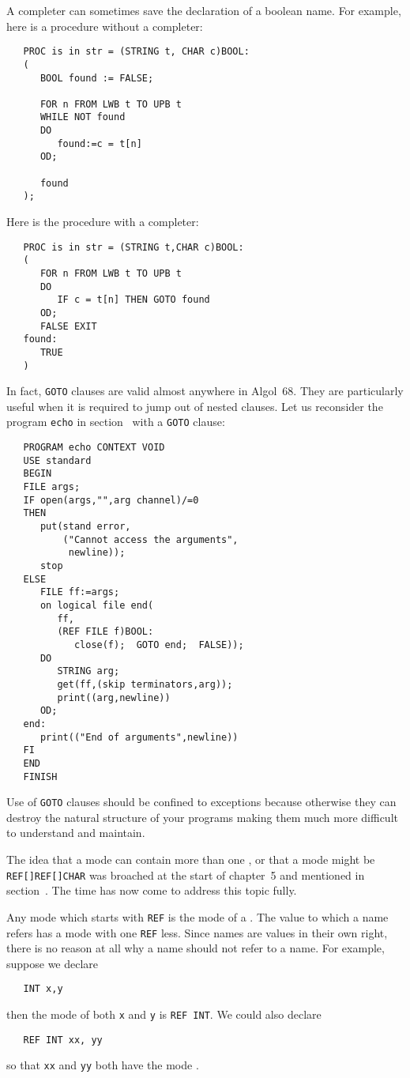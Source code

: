 A completer can sometimes save the declaration of a boolean name. For
example, here is a procedure without a completer:
\begin{verbatim}
   PROC is in str = (STRING t, CHAR c)BOOL:
   (
      BOOL found := FALSE;
   
      FOR n FROM LWB t TO UPB t
      WHILE NOT found
      DO
         found:=c = t[n]
      OD;
   
      found
   );
\end{verbatim}
\noindent
Here is the procedure with a completer:
\begin{verbatim}
   PROC is in str = (STRING t,CHAR c)BOOL:
   (
      FOR n FROM LWB t TO UPB t
      DO
         IF c = t[n] THEN GOTO found
      OD;
      FALSE EXIT
   found:
      TRUE
   )
\end{verbatim}

In fact, \verb|GOTO| clauses are valid almost anywhere in Algol~68.
They are particularly useful when it is required to jump out of nested
clauses. Let us reconsider the program \verb|echo| in
section~ with a \verb|GOTO| clause:
\begin{verbatim}
   PROGRAM echo CONTEXT VOID
   USE standard
   BEGIN
   FILE args;
   IF open(args,"",arg channel)/=0
   THEN
      put(stand error,
          ("Cannot access the arguments",
           newline));
      stop
   ELSE
      FILE ff:=args;
      on logical file end(
         ff,
         (REF FILE f)BOOL:
            close(f);  GOTO end;  FALSE));
      DO
         STRING arg;
         get(ff,(skip terminators,arg));
         print((arg,newline))
      OD;
   end:
      print(("End of arguments",newline))
   FI
   END
   FINISH
\end{verbatim}
\noindent
Use of \verb|GOTO| clauses should be confined to exceptions because
otherwise they can destroy the natural structure of your programs
making them much more difficult to understand and maintain.

The idea that a mode can contain more than one , or that a
mode might be \verb|REF[]REF[]CHAR| was broached at the start of
chapter~5 and mentioned in section~. The time has now
come to address this topic fully.

Any mode which starts with \verb|REF| is the mode of a
. The value to which a name refers has a mode with one
\verb|REF| less.  Since names are values in their own right, there is
no reason at all why a name should not refer to a name.  For example,
suppose we declare
\begin{verbatim}
   INT x,y
\end{verbatim}
\noindent
then the mode of both \verb|x| and \verb|y| is \verb|REF INT|. We
could also declare
\begin{verbatim}
   REF INT xx, yy
\end{verbatim}
\noindent
so that \verb|xx| and \verb|yy| both have the mode
.

